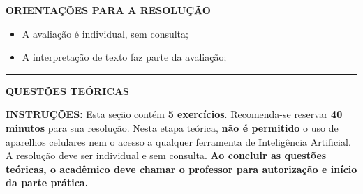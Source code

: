 \documentclass[12pt,a4paper]{article}
\begin{document}
\vspace{0.3cm}

\textbf{ORIENTAÇÕES PARA A RESOLUÇÃO}  

\begin{itemize}
    \item A avaliação é individual, sem consulta;
    \item A interpretação de texto faz parte da avaliação;
\end{itemize}

\vspace{0.5cm}

\begin{center}
    \rule{\textwidth}{0.4pt}
    \textbf{QUESTÕES TEÓRICAS}
\end{center}

\vspace{0.2cm}

\textbf{INSTRUÇÕES:} Esta seção contém \textbf{5 exercícios}. Recomenda-se reservar \textbf{40 minutos} para sua resolução. Nesta etapa teórica, \textbf{não é permitido} o uso de aparelhos celulares nem o acesso a qualquer ferramenta de Inteligência Artificial. A resolução deve ser individual e sem consulta. \textbf{Ao concluir as questões teóricas, o acadêmico deve chamar o professor para autorização e início da parte prática.}

\vspace{0.3cm}
\end{document}
